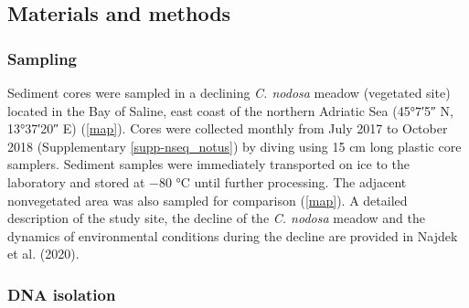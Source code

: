 \documentclass[12pt,]{article}
\begin{document}
\newpage

\hypertarget{materials-and-methods}{%
\subsection{Materials and methods}\label{materials-and-methods}}

\hypertarget{sampling}{%
\subsubsection{Sampling}\label{sampling}}

Sediment cores were sampled in a declining \emph{C. nodosa} meadow
(vegetated site) located in the Bay of Saline, east coast of the
northern Adriatic Sea (\ang{45;7;5} N, \ang{13;37;20} E)
(\autoref{map}). Cores were collected monthly from July 2017 to October
2018 (Supplementary \autoref{supp-nseq_notus}) by diving using 15 cm
long plastic core samplers. Sediment samples were immediately
transported on ice to the laboratory and stored at \num{-80}
\si{\degreeCelsius} until further processing. The adjacent nonvegetated
area was also sampled for comparison (\autoref{map}). A detailed
description of the study site, the decline of the \emph{C. nodosa}
meadow and the dynamics of environmental conditions during the decline
are provided in Najdek et al. (2020).

\hypertarget{dna-isolation}{%
\subsubsection{DNA isolation}\label{dna-isolation}}
\end{document}
